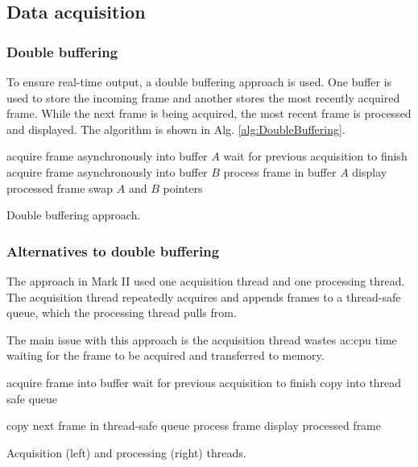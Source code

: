 \documentclass{article}
\begin{document}
\subsection{Data acquisition}
\subsubsection{Double buffering}
To ensure real-time output, a double buffering approach is used.
One buffer is used to store the incoming frame and another stores the most recently acquired frame.
While the next frame is being acquired, the most recent frame is processed and displayed. The algorithm is shown in Alg. \ref{alg:DoubleBuffering}.

\begin{algorithm}
	\centering
	\begin{algorithmic}
		\State acquire frame asynchronously into buffer $A$
		\State wait for previous acquisition to finish
		\State acquire frame asynchronously into buffer $B$
		\State process frame in buffer $A$
		\State display processed frame
		\State swap $A$ and $B$ pointers
		\EndWhile
	\end{algorithmic}
	\caption{Double buffering approach.}\label{alg:DoubleBuffering}
\end{algorithm}

\subsubsection{Alternatives to double buffering}
The approach in Mark II used one acquisition thread and one processing thread. The acquisition thread repeatedly acquires and appends frames to a thread-safe queue, which the processing thread pulls from.

The main issue with this approach is the acquisition thread wastes \acrshort{ac:cpu} time waiting for the frame to be acquired and transferred to memory.

\begin{algorithm}
	\begin{minipage}{0.48\linewidth}
		\begin{algorithmic}
			\While {keep acquiring data}
			\State acquire frame into buffer
			\State wait for previous acquisition to finish
			\State copy into thread safe queue
			\EndWhile
		\end{algorithmic}
	\end{minipage}
	\begin{minipage}{0.48\linewidth}
		\begin{algorithmic}
			\State copy next frame in thread-safe queue
			\State process frame
			\State display processed frame
			\EndWhile
		\end{algorithmic}
	\end{minipage}
	\caption{Acquisition (left) and processing (right) threads.}\label{alg:TwoThreads}
\end{algorithm}
\end{document}

